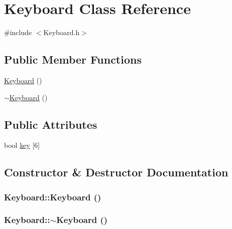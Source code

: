 \hypertarget{classKeyboard}{
\section{Keyboard Class Reference}
\label{classKeyboard}
}


{\ttfamily \#include $<$Keyboard.h$>$}\subsection*{Public Member Functions}
\begin{DoxyCompactItemize}
\item 
\hyperlink{classKeyboard_ad6b0bb849d6bb7cdf63091e40b5f5f7f}{Keyboard} ()
\item 
\hyperlink{classKeyboard_af6a99ec66c8c722a45b967bf79167038}{$\sim$Keyboard} ()
\end{DoxyCompactItemize}
\subsection*{Public Attributes}
\begin{DoxyCompactItemize}
\item 
bool \hyperlink{classKeyboard_aad6d0d22cffc14a293b3a3b6a98da05d}{key} \mbox{[}6\mbox{]}
\end{DoxyCompactItemize}


\subsection{Constructor \& Destructor Documentation}
\hypertarget{classKeyboard_ad6b0bb849d6bb7cdf63091e40b5f5f7f}{
\subsubsection[{Keyboard}]{\setlength{\rightskip}{0pt plus 5cm}Keyboard::Keyboard ()}}
\label{classKeyboard_ad6b0bb849d6bb7cdf63091e40b5f5f7f}
\hypertarget{classKeyboard_af6a99ec66c8c722a45b967bf79167038}{
\subsubsection[{$\sim$Keyboard}]{\setlength{\rightskip}{0pt plus 5cm}Keyboard::$\sim$Keyboard ()}}
\label{classKeyboard_af6a99ec66c8c722a45b967bf79167038}


